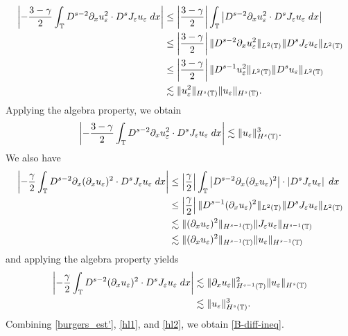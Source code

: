 	\begin{equation}
		\begin{split}
			\left | - \frac{3 -\gamma}{2} \int_{\mathbb{T}} D^{s-2} \partial_x u_\varepsilon^2 \cdot
			D^s J_\varepsilon u_\varepsilon \; dx \right |
			& \le \left | \frac{3- \gamma}{2} \right | \int_{\mathbb{T}} \left |
			D^{s-2} \partial_x u_\varepsilon^2 \cdot D^s J_\varepsilon u_\varepsilon \; dx \right | 
			\\
			& \le \left | \frac{3- \gamma}{2} \right |
			\|D^{s-2} \partial_x u_\varepsilon^2 \|_{L^2(\mathbb{T})} 
			\|D^s J_\varepsilon u_\varepsilon \|_{L^2(\mathbb{T})}
			\\
			& \le \left | \frac{3- \gamma}{2} \right |
			\|D^{s-1} u_\varepsilon^2 \|_{L^2(\mathbb{T})} 
			\|D^s u_\varepsilon \|_{L^2(\mathbb{T})}
			\\
			& \lesssim \| u_\varepsilon^2 \|_{H^s(\mathbb{T})} \| u_\varepsilon \|_{H^s(\mathbb{T})}.
		\end{split}
	\end{equation}
	Applying the algebra property, we obtain
	\begin{equation}
		\label{hl1}
		\begin{split}
			\left | - \frac{3 -\gamma}{2} \int_{\mathbb{T}} D^{s-2} \partial_x u_\varepsilon^2 \cdot
			D^s J_\varepsilon u_\varepsilon \; dx \right |
			\lesssim \| u_\varepsilon \|_{H^s(\mathbb{T})}^3.
		\end{split}
	\end{equation}
	We also have
	\begin{equation}
		\begin{split}
			\left |- \frac{\gamma}{2} \int_{\mathbb{T}} D^{s-2} \partial_x (\partial_x u_\varepsilon)^2 \cdot
			D^s J_\varepsilon u_\varepsilon \; dx \right |
			& \le \left | \frac{\gamma}{2} \right | \int_{\mathbb{T}} \left | D^{s-2} \partial_x (\partial_x u_\varepsilon)^2 \right |
			\cdot \left |D^s J_\varepsilon u_\varepsilon \right | \; dx
			\\
			& \le \left | \frac{\gamma}{2} \right |
			\| D^{s-1} (\partial_x u_\varepsilon)^2 \|_{L^2(\mathbb{T})}
			\| D^s J_\varepsilon u_\varepsilon \|_{L^2(\mathbb{T})}
			\\
			& \lesssim \|(\partial_x u_\varepsilon)^2 \|_{H^{s-1}(\mathbb{T})}
			\| J_\varepsilon u_\varepsilon \|_{H^{s-1}(\mathbb{T})} 
			\\
			& \lesssim \|(\partial_x u_\varepsilon)^2 \|_{H^{s-1}(\mathbb{T})} \| u_\varepsilon \|_{H^{s-1}(\mathbb{T})} 
		\end{split}
	\end{equation}
	and applying the algebra property yields
	\begin{equation}
		\label{hl2}
		\begin{split}
		\left | - \frac{\gamma}{2} \int_{\mathbb{T}} D^{s-2} (\partial_x u_\varepsilon)^2 \cdot
		D^s J_\varepsilon u_\varepsilon \; dx \right |
		& \lesssim \| \partial_x u_\varepsilon \|_{H^{s-1}(\mathbb{T})}^2 \| u_\varepsilon \|_{H^s(\mathbb{T})} 
		\\
		& \lesssim \|u_\varepsilon\|_{H^s(\mathbb{T})}^3.
	\end{split}
	\end{equation}
	Combining \eqref{burgers_est'}, \eqref{hl1}, and \eqref{hl2}, we obtain
	\eqref{B-diff-ineq}.
	\noindent
